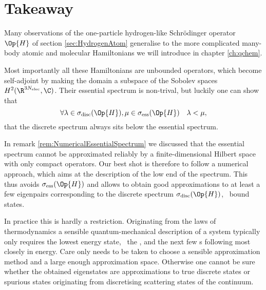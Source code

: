 \section{Takeaway}
\label{sec:SpectralTakeAway}
Many observations of the one-particle hydrogen-like Schrödinger operator $\Op{H}$
of section \vref{sec:HydrogenAtom}
generalise to the more complicated many-body atomic and molecular Hamiltonians
we will introduce in chapter \vref{ch:qchem}.

Most importantly all these Hamiltonians are unbounded operators,
which become self-adjoint by making the domain
a subspace of the Sobolev spaces $H^2(\R^{3\Nelec}, \C)$.
Their essential spectrum is non-trival,
but luckily one can show~\cite{Zhislin1959,Zhislin1960,Reed1978,Teschl2014} that
\[ \forall \lambda \in \sigma_{\text{disc}}(\Op{H}),
	\mu \in \sigma_{\text{ess}}(\Op{H}) \quad \lambda < \mu, \]
\ie that the discrete spectrum always sits below the essential spectrum.

In remark \vref{rem:NumericalEssentialSpectrum} we discussed
that the essential spectrum cannot be approximated reliably
by a finite-dimensional Hilbert space with only compact operators.
Our best shot is therefore to follow a numerical approach,
which aims at the description of the low end of the spectrum.
This thus avoids $\sigma_{\text{ess}}(\Op{H})$
and allows to obtain good approximations to at least a few
eigenpairs corresponding to the discrete spectrum $\sigma_{\text{disc}}(\Op{H})$,
\ie~bound states.

In practice this is hardly a restriction.
Originating from the laws of thermodynamics
a sensible quantum-mechanical description of a system
typically only requires the lowest energy state,
\ie~the , and the next few s
following most closely in energy.
Care only needs to be taken to choose a sensible approximation
method and a large enough approximation space.
Otherwise one cannot be sure whether the obtained eigenstates
are approximations to true discrete states
or spurious states originating from discretising scattering states
of the continuum.
